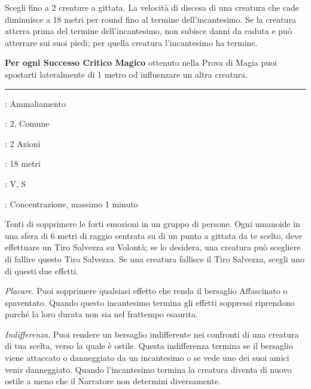 \begin{multicols}{2}
Scegli fino a 2 creature a gittata. La velocità di discesa di una creatura che cade diminuisce a 18 metri per round fino al termine dell'incantesimo. Se la creatura atterra prima del termine dell'incantesimo, non subisce danni da caduta e può atterrare sui suoi piedi; per quella creatura l'incantesimo ha termine.

\textbf{Per ogni Successo Critico Magico} ottenuto nella Prova di Magia puoi spostarti lateralmente di 1 metro od influenzare un altra creatura.

\smallskip\noindent\rule{\linewidth}{2pt} \hypertarget{Calmare Emozioni}{}\medskip{}
\noindent
\begin{description}[noitemsep, topsep=0pt, parsep=0pt, partopsep=0pt, leftmargin=0cm, labelwidth=2.8cm]
	\item[\textbf{Lista di Magia}]: Ammaliamento
	\item[\textbf{Livello}]: 2, Comune
	\item[\textbf{T. di Lancio}]: 2 Azioni
	\item[\textbf{Gittata}]: 18 metri
	\item[\textbf{Componenti}]: V, S
	\item[\textbf{Durata}]: Concentrazione, massimo 1 minuto
\end{description}

Tenti di sopprimere le forti emozioni in un gruppo di persone. Ogni umanoide in una sfera di 6 metri di raggio centrata su di un punto a gittata da te scelto, deve effettuare un Tiro Salvezza su Volontà; se lo desidera, una creatura può scegliere di fallire questo Tiro Salvezza. Se una creatura fallisce il Tiro Salvezza, scegli uno di questi due effetti.

\emph{Placare}. Puoi sopprimere qualsiasi effetto che renda il bersaglio Affascinato o spaventato. Quando questo incantesimo termina gli effetti soppressi riprendono purché la loro durata non sia nel frattempo esaurita.

\emph{Indifferenza}. Puoi rendere un bersaglio indifferente nei confronti di una creatura di tua scelta, verso la quale è ostile. Questa indifferenza termina se il bersaglio viene attaccato o danneggiato da un incantesimo o se vede uno dei suoi amici venir danneggiato. Quando l'incantesimo termina la creatura diventa di nuovo ostile a meno che il Narratore non determini diversamente.


\end{multicols}
